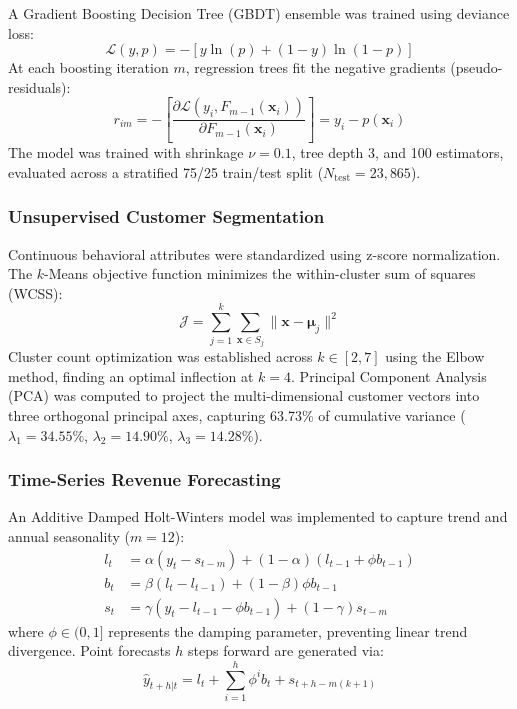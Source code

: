 \documentclass[conference]{IEEEtran}
\begin{document}
A Gradient Boosting Decision Tree (GBDT) ensemble \cite{chen2016xgboost} was trained using deviance loss:
\begin{equation}
\mathcal{L}(y, p) = - [y \ln(p) + (1 - y) \ln(1 - p)]
\end{equation}
At each boosting iteration $m$, regression trees fit the negative gradients (pseudo-residuals):
\begin{equation}
r_{im} = -\left[\frac{\partial \mathcal{L}(y_i, F_{m-1}(\mathbf{x}_i))}{\partial F_{m-1}(\mathbf{x}_i)}\right] = y_i - p(\mathbf{x}_i)
\end{equation}
The model was trained with shrinkage $\nu = 0.1$, tree depth 3, and 100 estimators, evaluated across a stratified 75/25 train/test split ($N_{\text{test}} = 23,865$).

\subsubsection{Unsupervised Customer Segmentation}
Continuous behavioral attributes were standardized using z-score normalization. The $k$-Means objective function minimizes the within-cluster sum of squares (WCSS):
\begin{equation}
\mathcal{J} = \sum_{j=1}^{k} \sum_{\mathbf{x} \in S_j} \|\mathbf{x} - \boldsymbol{\mu}_j\|^2
\end{equation}
Cluster count optimization was established across $k \in [2, 7]$ using the Elbow method, finding an optimal inflection at $k=4$. Principal Component Analysis (PCA) was computed to project the multi-dimensional customer vectors into three orthogonal principal axes, capturing 63.73\% of cumulative variance ($\lambda_1 = 34.55\%$, $\lambda_2 = 14.90\%$, $\lambda_3 = 14.28\%$).

\subsubsection{Time-Series Revenue Forecasting}
An Additive Damped Holt-Winters model \cite{gardner1985forecasting} was implemented to capture trend and annual seasonality ($m=12$):
\begin{align}
l_t &= \alpha(y_t - s_{t-m}) + (1 - \alpha)(l_{t-1} + \phi b_{t-1}) \\
b_t &= \beta(l_t - l_{t-1}) + (1 - \beta)\phi b_{t-1} \\
s_t &= \gamma(y_t - l_{t-1} - \phi b_{t-1}) + (1 - \gamma)s_{t-m}
\end{align}
where $\phi \in (0, 1]$ represents the damping parameter, preventing linear trend divergence. Point forecasts $h$ steps forward are generated via:
\begin{equation}
\hat{y}_{t+h|t} = l_t + \sum_{i=1}^h \phi^i b_t + s_{t+h-m(k+1)}
\end{equation}
\end{document}
